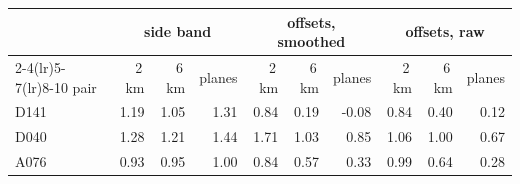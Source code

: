 \begin{tabular}{lrrrrrrrrr}
\toprule
 & \multicolumn{3}{c}{side band} & \multicolumn{3}{c}{offsets, smoothed} & \multicolumn{3}{c}{offsets, raw} \\
\cmidrule(lr){2-4}\cmidrule(lr){5-7}\cmidrule(lr){8-10}
pair & 2\,km & 6\,km & planes & 2\,km & 6\,km & planes & 2\,km & 6\,km & planes \\
\midrule
D141 & 1.19 & 1.05 & 1.31 & 0.84 & 0.19 & -0.08 & 0.84 & 0.40 & 0.12 \\
D040 & 1.28 & 1.21 & 1.44 & 1.71 & 1.03 & 0.85 & 1.06 & 1.00 & 0.67 \\
A076 & 0.93 & 0.95 & 1.00 & 0.84 & 0.57 & 0.33 & 0.99 & 0.64 & 0.28 \\
\bottomrule
\end{tabular}

